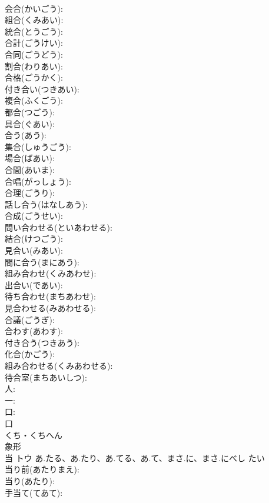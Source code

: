 \documentclass[8pt]{extreport}
\begin{document}
\begin{CJK}{UTF8}{min}
\\	会合(かいごう): 
\\	組合(くみあい): 
\\	統合(とうごう): 
\\	合計(ごうけい): 
\\	合同(ごうどう): 
\\	割合(わりあい): 
\\	合格(ごうかく): 
\\	付き合い(つきあい): 
\\	複合(ふくごう): 
\\	都合(つごう): 
\\	具合(ぐあい): 
\\	合う(あう): 
\\	集合(しゅうごう): 
\\	場合(ばあい): 
\\	合間(あいま): 
\\	合唱(がっしょう): 
\\	合理(ごうり): 
\\	話し合う(はなしあう): 
\\	合成(ごうせい): 
\\	問い合わせる(といあわせる): 
\\	結合(けつごう): 
\\	見合い(みあい): 
\\	間に合う(まにあう): 
\\	組み合わせ(くみあわせ): 
\\	出合い(であい): 
\\	待ち合わせ(まちあわせ): 
\\	見合わせる(みあわせる): 
\\	合議(ごうぎ): 
\\	合わす(あわす): 
\\	付き合う(つきあう): 
\\	化合(かごう): 
\\	組み合わせる(くみあわせる): 
\\	待合室(まちあいしつ): 
\\	人: 
\\	一: 
\\	口: 
\\	口	
\\	くち・くちへん	
\\	象形 
\\	当	トウ	あ.たる、あ.たり、あ.てる、あ.て、まさ.に、まさ.にべし	たい	
\\	当り前(あたりまえ): 
\\	当り(あたり): 
\\	手当て(てあて): 

\end{CJK}
\end{document}
